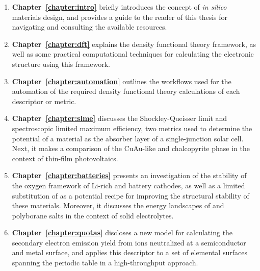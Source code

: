 \begin{enumerate}[]

\vfill
\item \textbf{Chapter~\ref{chapter:intro}} briefly introduces the concept of 
\textit{in silico} materials design, and provides a guide to the reader of 
this thesis for navigating and consulting the available resources.

\vfill
\item \textbf{Chapter~\ref{chapter:dft}} explains the density functional theory 
framework, as well as some practical computational techniques for calculating 
the electronic structure using this framework.

\vfill
\item \textbf{Chapter~\ref{chapter:automation}} outlines the workflows used for 
the automation of the required density functional theory calculations of each 
descriptor or metric.

\vfill
\item \textbf{Chapter~\ref{chapter:slme}} discusses the Shockley-Queisser limit 
and spectroscopic limited maximum efficiency, two metrics used to determine the 
potential of a material as the absorber layer of a single-junction solar cell. 
Next, it makes a comparison of the CuAu-like and chalcopyrite phase in the 
context of thin-film photovoltaics.

\vfill
\item \textbf{Chapter~\ref{chapter:batteries}} presents an investigation of the 
stability of the oxygen framework of Li-rich  and  
battery cathodes, as well as a limited substitution of  as a potential 
recipe for improving the structural stability of these materials. Moreover, it 
discusses the energy landscapes of  and  polyborane 
salts in the context of solid electrolytes.

\vfill
\item \textbf{Chapter~\ref{chapter:quotas}} discloses a new model for 
calculating the secondary electron emission yield from ions neutralized at a 
semiconductor and metal surface, and applies this descriptor to a set of 
elemental surfaces spanning the periodic table in a high-throughput approach.

\end{enumerate}
